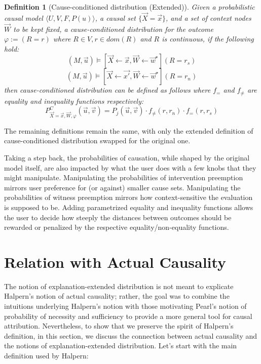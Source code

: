 \documentclass{article}
\newtheorem{definition}{Definition}
\begin{document}
\begin{definition}[Cause-conditioned distribution (Extended)]
    Given a probabilistic causal model \(\langle U, V, F, P(u) \rangle\), a causal set \(\{\vec{X} = \vec{x}\}\), and a set of context nodes \(\vec{W}\) to be kept fixed, a cause-conditioned distribution for the outcome \(\varphi := (R = r)\) where \(R \in V, r \in \mathit{dom}(R)\) and \(R\) is continuous, if the following hold:
    \[(M, \vec{u}) 
    \vDash [\vec{X} \leftarrow \vec{x}, \vec{W} \leftarrow \vec{w}^\star](R = r_s)\]
    \[(M, \vec{u}) 
    \vDash [\vec{X} \leftarrow \vec{x'}, \vec{W} \leftarrow \vec{w}^\star](R = r_n)\]
    then cause-conditioned distribution can be defined as follows where \(f_=\) and \(f_{\neq}\) are equality and inequality functions respectively:
    \[P^C_{\vec{X} = \vec{x}, \vec{W}, \varphi}(\vec{u}, \vec{v}) = P_j(\vec{u}, \vec{v}) \cdot f_{\neq}(r, r_n) \cdot f_{=}(r, r_s)\]
\end{definition}

\noindent The remaining  definitions remain the same, with only the extended definition of cause-conditioned distribution swapped for the original one.

Taking a step back,  the probabilities of causation, while shaped by the original model itself, are also impacted by what the user does with a few knobs that they might manipulate. Manipulating the probabilities of intervention preemption mirrors user preference for (or against) smaller cause sets. Manipulating the probabilities of witness preemption mirrors how context-sensitive the evaluation is supposed to be. Adding parametrized equality and inequality functions allows the user to decide how steeply the distances between outcomes should be rewarded or penalized by the respective equality/non-equality functions. 


\section{Relation with Actual Causality}

The notion of explanation-extended distribution is not meant to explicate \linebreak Halpern's notion of actual causality; rather, the goal was to combine the intuitions underlying Halpern's notion with those motivating Pearl's notion of probability of necessity and sufficiency to provide a more general tool for causal attribution. Nevertheless, to show that we preserve the spirit of Halpern's definition, in this section, we discuss the connection between actual causality and the notions of explanation-extended distribution. Let's start with the main definition used by Halpern:
\end{document}
